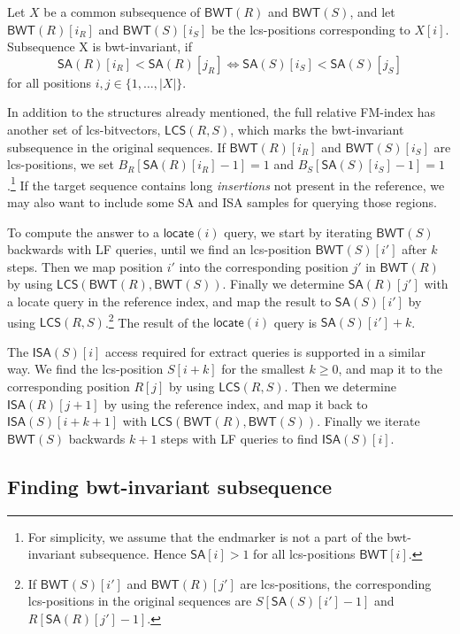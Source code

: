 \documentclass[a4paper,11pt]{llncs}
\newcommand{\set}[1]{\ensuremath{\{ #1 \}}}
\newcommand{\abs}[1]{\ensuremath{\lvert #1 \rvert}}
\newcommand{\SA}{\textsf{SA}}
\newcommand{\ISA}{\textsf{ISA}}
\newcommand{\mSA}{\ensuremath{\mathsf{SA}}}
\newcommand{\mISA}{\ensuremath{\mathsf{ISA}}}
\newcommand{\mBWT}{\ensuremath{\mathsf{BWT}}}
\newcommand{\mLCS}{\ensuremath{\mathsf{LCS}}}
\newcommand{\LF}{\textsf{LF}}
\newcommand{\locate}{\textsf{locate}}
\newcommand{\extract}{\textsf{extract}}
\newcommand{\mlocate}{\ensuremath{\mathsf{locate}}}
\begin{document}
\begin{definition}\label{def:bwt-invariant}
Let $X$ be a common subsequence of $\mBWT(R)$ and $\mBWT(S)$, and let $\mBWT(R)[i_{R}]$ and $\mBWT(S)[i_{S}]$ be the lcs-positions corresponding to $X[i]$. Subsequence X is bwt-invariant, if
$$
\mSA(R)[i_{R}] < \mSA(R)[j_{R}] \iff \mSA(S)[i_{S}] < \mSA(S)[j_{S}]
$$
for all positions $i, j \in \set{1, \dotsc, \abs{X}}$.
\end{definition}

In addition to the structures already mentioned, the full relative FM-index has another set of lcs-bitvectors, $\mLCS(R,S)$, which marks the bwt-invariant subsequence in the original sequences. If $\mBWT(R)[i_{R}]$ and $\mBWT(S)[i_{S}]$ are lcs-positions, we set $B_{R}[\mSA(R)[i_{R}]-1] = 1$ and $B_{S}[\mSA(S)[i_{S}]-1] = 1$.\footnote{For simplicity, we assume that the endmarker is not a part of the bwt-invariant subsequence. Hence $\mSA[i] > 1$ for all lcs-positions $\mBWT[i]$.} If the target sequence contains long \emph{insertions} not present in the reference, we may also want to include some \SA{} and \ISA{} samples for querying those regions.

To compute the answer to a $\mlocate(i)$ query, we start by iterating $\mBWT(S)$ backwards with \LF{} queries, until we find an lcs-position $\mBWT(S)[i']$ after $k$ steps. Then we map position $i'$ into the corresponding position $j'$ in $\mBWT(R)$ by using $\mLCS(\mBWT(R),\mBWT(S))$. Finally we determine $\mSA(R)[j']$ with a \locate{} query in the reference index, and map the result to $\mSA(S)[i']$ by using $\mLCS(R,S)$.\footnote{If $\mBWT(S)[i']$ and $\mBWT(R)[j']$ are lcs-positions, the corresponding lcs-positions in the original sequences are $S[\mSA(S)[i']-1]$ and $R[\mSA(R)[j']-1]$.} The result of the $\mlocate(i)$ query is $\mSA(S)[i']+k$.

The $\mISA(S)[i]$ access required for \extract{} queries is supported in a similar way. We find the lcs-position $S[i+k]$ for the smallest $k \ge 0$, and map it to the corresponding position $R[j]$ by using $\mLCS(R,S)$. Then we determine $\mISA(R)[j+1]$ by using the reference index, and map it back to $\mISA(S)[i+k+1]$ with $\mLCS(\mBWT(R),\mBWT(S))$. Finally we iterate $\mBWT(S)$ backwards $k+1$ steps with \LF{} queries to find $\mISA(S)[i]$.

\subsection{Finding bwt-invariant subsequence}
\end{document}
